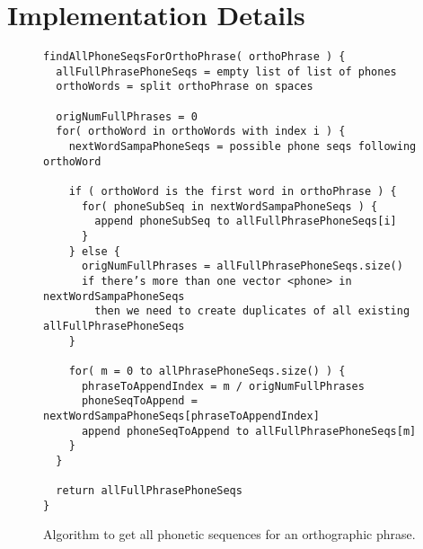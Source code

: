 \label{appendices}

\chapter{Implementation Details}
\label{appendix:table:implDetails}


\setlength\LTleft{-2in}
\begin{figure}
\begin{verbatim}
findAllPhoneSeqsForOrthoPhrase( orthoPhrase ) {
  allFullPhrasePhoneSeqs = empty list of list of phones
  orthoWords = split orthoPhrase on spaces
  
  origNumFullPhrases = 0
  for( orthoWord in orthoWords with index i ) {
    nextWordSampaPhoneSeqs = possible phone seqs following orthoWord
    
    if ( orthoWord is the first word in orthoPhrase ) {
      for( phoneSubSeq in nextWordSampaPhoneSeqs ) {
        append phoneSubSeq to allFullPhrasePhoneSeqs[i]
      }
    } else {
      origNumFullPhrases = allFullPhrasePhoneSeqs.size()
      if there’s more than one vector <phone> in nextWordSampaPhoneSeqs
        then we need to create duplicates of all existing allFullPhrasePhoneSeqs
    }
    
    for( m = 0 to allPhrasePhoneSeqs.size() ) {
      phraseToAppendIndex = m / origNumFullPhrases
      phoneSeqToAppend = nextWordSampaPhoneSeqs[phraseToAppendIndex]
      append phoneSeqToAppend to allFullPhrasePhoneSeqs[m]
    }
  }

  return allFullPhrasePhoneSeqs
}
\end{verbatim}
\captionfonts
\caption[Pseudocode for findAllPhoneSeqsForOrthoPhrase]{ Algorithm to get all phonetic sequences for an orthographic phrase. }
\label{fig:psuedoCode:findAllPhoneSeqsForOrthoPhrase}
\end{figure}




